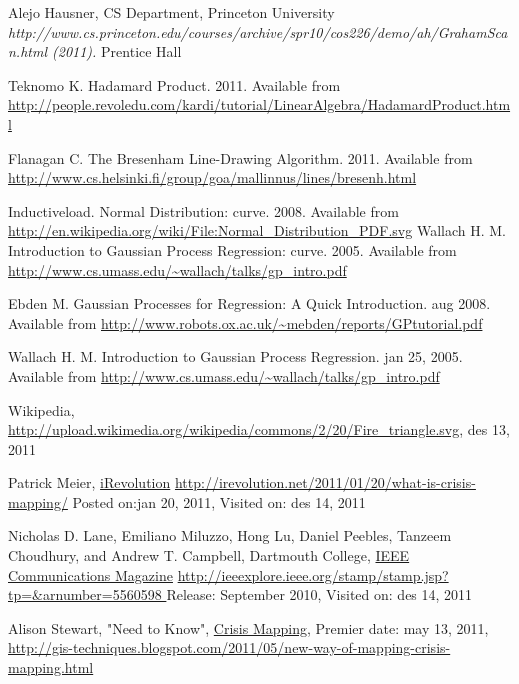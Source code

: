 
\begin{thebibliography}{4}
 Alejo Hausner, CS Department, Princeton University
 \emph{http://www.cs.princeton.edu/courses/archive/spr10/cos226/demo/ah/GrahamScan.html (2011).} Prentice Hall
 
 Teknomo K. Hadamard Product. 2011. Available from \url{http://people.revoledu.com/kardi/tutorial/LinearAlgebra/HadamardProduct.html} 

 Flanagan C. The Bresenham Line-Drawing Algorithm. 2011. Available from \url{http://www.cs.helsinki.fi/group/goa/mallinnus/lines/bresenh.html} 

 Inductiveload. Normal Distribution: curve. 2008. Available from \url{http://en.wikipedia.org/wiki/File:Normal_Distribution_PDF.svg} 
 Wallach H. M. Introduction to Gaussian Process Regression: curve. 2005. Available from \url{http://www.cs.umass.edu/~wallach/talks/gp_intro.pdf} 

 Ebden M. Gaussian Processes for Regression: A Quick Introduction. aug 2008. Available from \url{http://www.robots.ox.ac.uk/~mebden/reports/GPtutorial.pdf} 


 Wallach H. M. Introduction to Gaussian Process Regression. jan 25, 2005. Available from \url{http://www.cs.umass.edu/~wallach/talks/gp_intro.pdf} 

 Wikipedia,       \url{http://upload.wikimedia.org/wikipedia/commons/2/20/Fire_triangle.svg}, des 13, 2011

 Patrick Meier, \underline{iRevolution} \url{http://irevolution.net/2011/01/20/what-is-crisis-mapping/} Posted on:jan 20, 2011, Visited on: des 14, 2011

 Nicholas D. Lane, Emiliano Miluzzo, Hong Lu, Daniel Peebles, Tanzeem Choudhury,
and Andrew T. Campbell, Dartmouth College, \underline{IEEE Communications Magazine} \url{http://ieeexplore.ieee.org/stamp/stamp.jsp?tp=&arnumber=5560598 } Release: September 2010, Visited on: des 14, 2011

 Alison Stewart, "Need to Know", \underline{Crisis Mapping}, Premier date: may 13, 2011, \url{http://gis-techniques.blogspot.com/2011/05/new-way-of-mapping-crisis-mapping.html}



\end{thebibliography}

